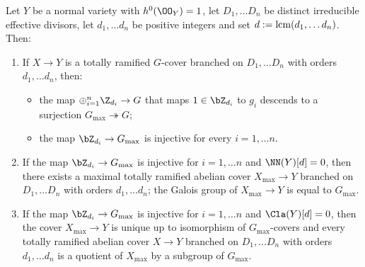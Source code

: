 \documentclass[10pt]{amsart}
\numberwithin{equation}{section}
\begin{document}
\begin{thm} \label{thm:Gmax}
Let $Y$ be a normal    variety with $h^0(\OO_Y)=1$, let $D_1, \dots D_n$ be distinct irreducible effective divisors, let $d_1, \dots d_n$ be positive integers and set $d:={\rm lcm}(d_1,\dots d_n)$. 
Then:
\begin{enumerate}
\item If $X\to Y$ is a totally ramified $G$-cover branched on $D_1,\dots D_n$ with orders $d_1,\dots d_n$, then:
\begin{itemize}
\item[(a)] the map $\oplus_{i=1}^n\Z_{d_i}\to G$ that maps $1\in \bZ_{d_i}$ to $g_i$  descends to  a surjection $G_{\max}\twoheadrightarrow G$;
\item[(b)] the map $\bZ_{d_i}\to G_{\max}$ is injective for every $i=1,\dots n$.
\end{itemize}
\item If  the map $\bZ_{d_i}\to G_{\max}$  is injective for $i=1,\dots n$ and $\NN(Y)[d]=0$, then there exists a maximal  totally ramified abelian cover  $X_{\max}\to Y$  branched on $D_1,\dots D_n$ with orders $d_1, \dots d_n$; the  Galois group of $X_{\max}\to Y$ is equal to $G_{\max}$.

\item If  the map $\bZ_{d_i}\to G_{\max}$  is injective for $i=1,\dots n$ and $\Cla(Y)[d]=0$,  then the cover $X_{\max}\to Y$ is unique up to isomorphism of $G_{\max}$-covers and every totally ramified abelian cover $X\to Y$ branched on $D_1,\dots D_n$ with orders $d_1,\dots d_n$ is a quotient of $X_{\max}$ by a subgroup of $G_{\max}$.
\end{enumerate}
\end{thm}
\end{document}
